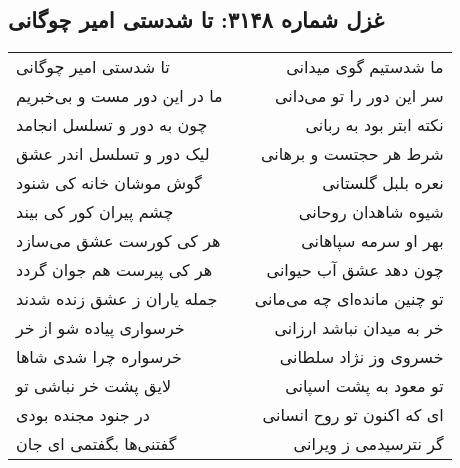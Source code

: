 \begin{center}
\section*{غزل شماره ۳۱۴۸: تا شدستی امیر چوگانی}
\label{sec:3148}
\begin{longtable}{l p{0.5cm} r}
تا شدستی امیر چوگانی
&&
ما شدستیم گوی میدانی
\\
ما در این دور مست و بی‌خبریم
&&
سر این دور را تو می‌دانی
\\
چون به دور و تسلسل انجامد
&&
نکته ابتر بود به ربانی
\\
لیک دور و تسلسل اندر عشق
&&
شرط هر حجتست و برهانی
\\
گوش موشان خانه کی شنود
&&
نعره بلبل گلستانی
\\
چشم پیران کور کی بیند
&&
شیوه شاهدان روحانی
\\
هر کی کورست عشق می‌سازد
&&
بهر او سرمه سپاهانی
\\
هر کی پیرست هم جوان گردد
&&
چون دهد عشق آب حیوانی
\\
جمله یاران ز عشق زنده شدند
&&
تو چنین مانده‌ای چه می‌مانی
\\
خرسواری پیاده شو از خر
&&
خر به میدان نباشد ارزانی
\\
خرسواره چرا شدی شاها
&&
خسروی وز نژاد سلطانی
\\
لایق پشت خر نباشی تو
&&
تو معود به پشت اسپانی
\\
در جنود مجنده بودی
&&
ای که اکنون تو روح انسانی
\\
گفتنی‌ها بگفتمی ای جان
&&
گر نترسیدمی ز ویرانی
\\
\end{longtable}
\end{center}
